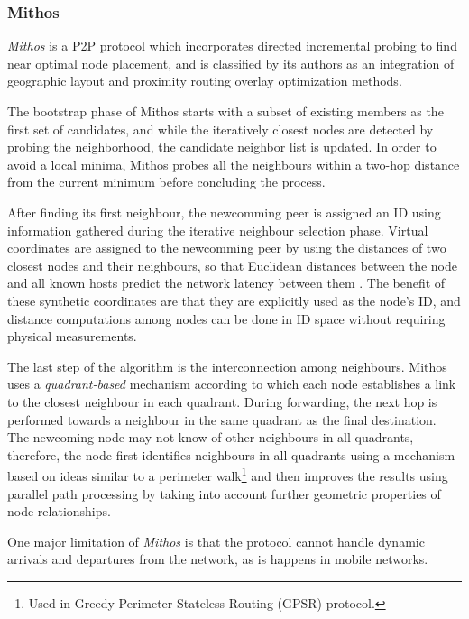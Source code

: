 \subsubsection{Mithos}
\emph{Mithos} \cite{WR2003} is a P2P protocol which incorporates directed
incremental probing to find near optimal node placement, and is classified by
its authors as an integration of geographic layout and proximity routing overlay
optimization methods.

The bootstrap phase of Mithos starts with a subset of existing members as the
first set of candidates, and while the iteratively closest nodes are detected by
probing the neighborhood, the candidate neighbor list is updated. In order to
avoid a local minima, Mithos probes all the neighbours within a two-hop distance
from the current minimum before concluding the process.

After finding its first neighbour, the newcomming peer is assigned an ID using
information gathered during the iterative neighbour selection phase. Virtual
coordinates are assigned to the newcomming peer by using the distances of two
closest nodes and their neighbours, so that Euclidean distances between the node
and all known hosts predict the network latency between them
\cite{cox_vivaldi_2004}. The benefit of these synthetic coordinates are that
they are explicitly used as the node's ID, and distance computations among nodes
can be done in ID space without requiring physical measurements.

The last step of the algorithm is the interconnection among neighbours. Mithos
uses a \emph{quadrant-based} mechanism according to which each node establishes
a link to the closest neighbour in each quadrant. During forwarding, the next
hop is performed towards a neighbour in the same quadrant as the final
destination. The newcoming node may not know of other neighbours in all
quadrants, therefore, the node first identifies neighbours in all quadrants
using a mechanism based on ideas similar to a perimeter walk\footnote{Used in
Greedy Perimeter Stateless Routing (GPSR) protocol.} and then improves the
results using parallel path processing by taking into account further geometric
properties of node relationships.

One major limitation of \textit{Mithos} is that the protocol cannot handle
dynamic arrivals and departures from the network, as is happens in mobile
networks.

%
%

